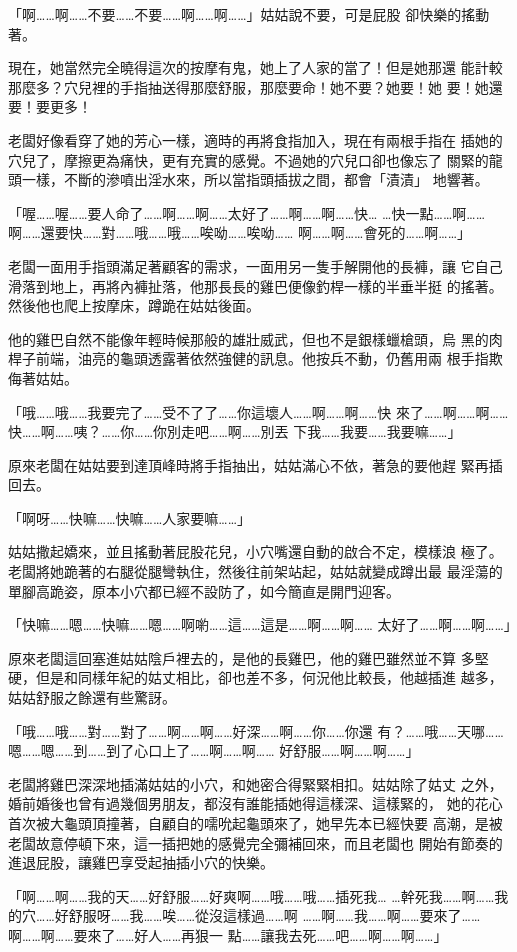 「啊……啊……不要……不要……啊……啊……」姑姑說不要，可是屁股
卻快樂的搖動著。

現在，她當然完全曉得這次的按摩有鬼，她上了人家的當了！但是她那還
能計較那麼多？穴兒裡的手指抽送得那麼舒服，那麼要命！她不要？她要！她
要！她還要！要更多！

老闆好像看穿了她的芳心一樣，適時的再將食指加入，現在有兩根手指在
插她的穴兒了，摩擦更為痛快，更有充實的感覺。不過她的穴兒口卻也像忘了
關緊的龍頭一樣，不斷的滲噴出淫水來，所以當指頭插拔之間，都會「漬漬」
地響著。

「喔……喔……要人命了……啊……啊……太好了……啊……啊……快…
…快一點……啊……啊……還要快……對……哦……哦……唉呦……唉呦……
啊……啊……會死的……啊……」

老闆一面用手指頭滿足著顧客的需求，一面用另一隻手解開他的長褲，讓
它自己滑落到地上，再將內褲扯落，他那長長的雞巴便像釣桿一樣的半垂半挺
的搖著。然後他也爬上按摩床，蹲跪在姑姑後面。

他的雞巴自然不能像年輕時候那般的雄壯威武，但也不是銀樣蠟槍頭，烏
黑的肉桿子前端，油亮的龜頭透露著依然強健的訊息。他按兵不動，仍舊用兩
根手指欺侮著姑姑。

「哦……哦……我要完了……受不了了……你這壞人……啊……啊……快
來了……啊……啊……快……啊……咦？……你……你別走吧……啊……別丟
下我……我要……我要嘛……」

原來老闆在姑姑要到達頂峰時將手指抽出，姑姑滿心不依，著急的要他趕
緊再插回去。

「啊呀……快嘛……快嘛……人家要嘛……」

姑姑撒起嬌來，並且搖動著屁股花兒，小穴嘴還自動的啟合不定，模樣浪
極了。老闆將她跪著的右腿從腿彎執住，然後往前架站起，姑姑就變成蹲出最
最淫蕩的單腳高跪姿，原本小穴都已經不設防了，如今簡直是開門迎客。

「快嘛……嗯……快嘛……嗯……啊喲……這……這是……啊……啊……
太好了……啊……啊……」

原來老闆這回塞進姑姑陰戶裡去的，是他的長雞巴，他的雞巴雖然並不算
多堅硬，但是和同樣年紀的姑丈相比，卻也差不多，何況他比較長，他越插進
越多，姑姑舒服之餘還有些驚訝。

「哦……哦……對……對了……啊……啊……好深……啊……你……你還
有？……哦……天哪……嗯……嗯……到……到了心口上了……啊……啊……
好舒服……啊……啊……」

老闆將雞巴深深地插滿姑姑的小穴，和她密合得緊緊相扣。姑姑除了姑丈
之外，婚前婚後也曾有過幾個男朋友，都沒有誰能插她得這樣深、這樣緊的，
她的花心首次被大龜頭頂撞著，自顧自的嚅吮起龜頭來了，她早先本已經快要
高潮，是被老闆故意停頓下來，這一插把她的感覺完全彌補回來，而且老闆也
開始有節奏的進退屁股，讓雞巴享受起抽插小穴的快樂。

「啊……啊……我的天……好舒服……好爽啊……哦……哦……插死我…
…幹死我……啊……我的穴……好舒服呀……我……唉……從沒這樣過……啊
……啊……我……啊……要來了……啊……啊……要來了……好人……再狠一
點……讓我去死……吧……啊……啊……」

